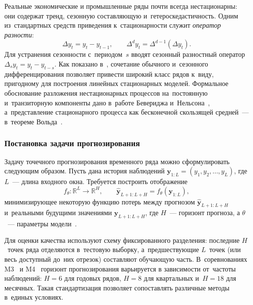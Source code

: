 Реальные экономические и промышленные ряды почти всегда нестационарны:
они содержат тренд, сезонную составляющую и~гетероскедастичность.
Одним из~стандартных средств приведения к~стационарности служит
\textit{оператор разности}:
\begin{equation}
\label{eq:diff}
\Delta y_t = y_t - y_{t-1}, \qquad
\Delta^d y_t = \Delta^{d-1}(\Delta y_t).
\end{equation}
Для устранения сезонности с~периодом~$s$ вводят сезонный разностный
оператор $\Delta_s y_t = y_t - y_{t-s}$.  Как показано
в~\cite{box1970time}, сочетание обычного и~сезонного дифференцирования
позволяет привести широкий класс рядов к~виду, пригодному для
построения линейных стационарных моделей.  Формальное обоснование
разложения нестационарных процессов на~постоянную и~транзиторную
компоненты дано в~работе Бевериджа и~Нельсона~\cite{beveridge1981decomposition},
а~представление стационарного процесса как бесконечной скользящей
средней~--- в~теореме Вольда~\cite{wold1938study}.


\subsubsection{Постановка задачи прогнозирования}
\label{sssec:problem-statement}

Задачу точечного прогнозирования временного ряда можно сформулировать
следующим образом.  Пусть дана история наблюдений
$\mathbf{y}_{1:L} = (y_1, y_2, \ldots, y_L)$, где $L$~--- длина
входного окна.  Требуется построить отображение
\begin{equation}
\label{eq:forecast-map}
f_\theta \colon \mathbb{R}^L \to \mathbb{R}^H, \qquad
\hat{\mathbf{y}}_{L+1:L+H} = f_\theta(\mathbf{y}_{1:L}),
\end{equation}
минимизирующее некоторую функцию потерь между прогнозом
$\hat{\mathbf{y}}_{L+1:L+H}$ и~реальными будущими значениями
$\mathbf{y}_{L+1:L+H}$, где $H$~--- горизонт прогноза, а $\theta$~--- параметры модели~\cite{hyndman2021forecasting}.

Для оценки качества используют схему фиксированного разделения:
последние $H$~точек ряда отделяются в~тестовую выборку, а~предшествующие
$L$~точек (или весь доступный до~них отрезок) составляют обучающую
часть.  В~соревнованиях M3~\cite{makridakis2000m3} и
M4~\cite{makridakis2020m4} горизонт прогнозирования варьируется в
зависимости от~частоты наблюдений: $H = 6$ для годовых рядов, $H = 8$
для квартальных и~$H = 18$ для месячных.  Такая стандартизация
позволяет сопоставлять различные методы в~единых условиях.

